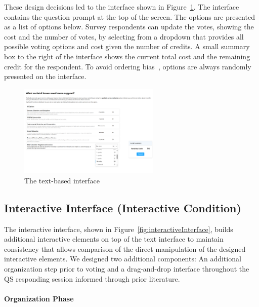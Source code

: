 These design decisions led to the interface shown in Figure~\ref{fig:textInterface}. The interface contains the question prompt at the top of the screen. The options are presented as a list of options below. Survey respondents can update the votes, showing the cost and the number of votes, by selecting from a dropdown that provides all possible voting options and cost given the number of credits. A small summary box to the right of the interface shows the current total cost and the remaining credit for the respondent. To avoid ordering bias~\cite{ferberOrderBiasMail1952, couperWebSurveyDesign2001}, options are always randomly presented on the interface.

\begin{figure}[H]
    \centering
    \includegraphics[width=0.6\textwidth]{content/image/text_interface.png}
    \caption{The text-based interface}
    \label{fig:textInterface}
\end{figure}

\subsection{Interactive Interface (Interactive Condition)}
The interactive interface, shown in Figure~\ref{fig:interactiveInterface}, builds additional interactive elements on top of the text interface to maintain consistency that allows comparison of the direct manipulation of the designed interactive elements. We designed two additional components: An additional organization step prior to voting and a drag-and-drop interface throughout the QS responding session informed through prior literature.

\paragraph{Organization Phase}


